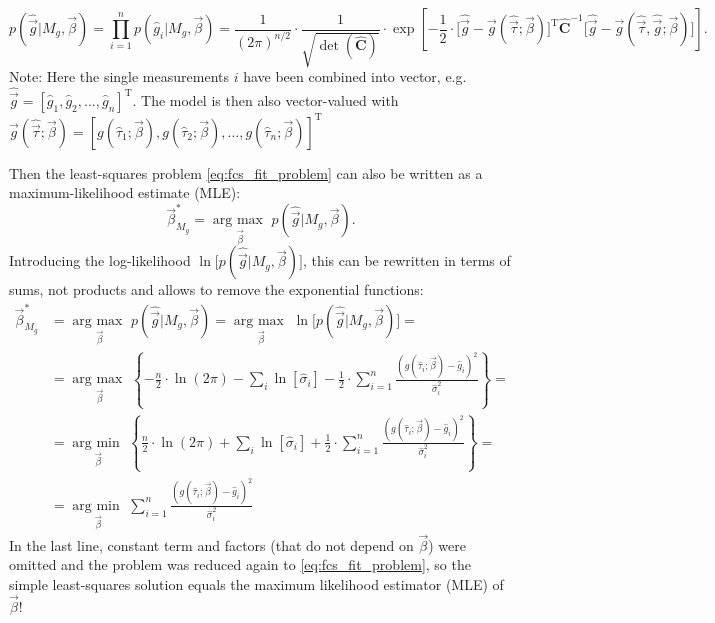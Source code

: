 \documentclass[a4paper,notitlepage]{article}
\DeclareMathOperator*{\argmin}{arg\:min\ }
\DeclareMathOperator*{\argmax}{arg\:max\ }
\newcommand{\mat}[1]{\mathrm{\mathbf{#1}}}
\begin{document}
\begin{equation}\label{eq:fcs_likelihood_covmatrix}
  p(\hat{\vec{g}}|M_g,\vec{\beta})=\prod\limits_{i=1}^np(\hat{g}_i|M_g,\vec{\beta})%
  =\frac{1}{(2\pi)^{n/2}}\cdot\frac{1}{\sqrt{\det(\hat{\mat{C}})}}\cdot\exp\left[-\frac{1}{2}\cdot\bigl[\hat{\vec{g}}-\vec{g}(\hat{\vec{\tau}}; \vec{\beta})\bigr]^\mathrm{T}\hat{\mat{C}}^{-1} \bigl[\hat{\vec{g}}-\vec{g}(\hat{\vec{\tau}}, \hat{\vec{g}}; \vec{\beta})\bigr]\right].
\end{equation}
Note: Here the single measurements $i$ have been combined into vector, e.g. $\hat{\vec{g}}=\left[\hat{g}_1, \hat{g}_2, ..., \hat{g}_n\right]^\mathrm{T}$. The model is then also vector-valued with $\vec{g}(\hat{\vec{\tau}}; \vec{\beta})=\left[g(\hat{\tau}_1;\vec{\beta}), g(\hat{\tau}_2;\vec{\beta}), ..., g(\hat{\tau}_n;\vec{\beta})\right]^\mathrm{T}$

Then the least-squares problem \eqref{eq:fcs_fit_problem} can also be written as a maximum-likelihood estimate (MLE):
\begin{equation}\label{eq:fcs_fit_problem_maxlikelihood}
  \vec{\beta}_{M_g}^\ast=\argmax\limits_{\vec{\beta}}p(\hat{\vec{g}}|M_g,\vec{\beta}).
\end{equation}
Introducing the log-likelihood $\ln \bigl[p(\hat{\vec{g}}|M_g,\vec{\beta})\bigr]$, this can be rewritten in terms of sums, not products and allows to remove the exponential functions:
\begin{align*}
  \vec{\beta}_{M_g}^\ast&=\argmax\limits_{\vec{\beta}}p(\hat{\vec{g}}|M_g,\vec{\beta})=\argmax\limits_{\vec{\beta}}\ln\bigl[p(\hat{\vec{g}}|M_g,\vec{\beta})\bigr]=\\
    &=\argmax\limits_{\vec{\beta}}\left\{-\frac{n}{2}\cdot\ln(2\pi)-\sum\limits_i\ln\left[\hat{\sigma}_i\right]-\frac{1}{2}\cdot\sum\limits_{i=1}^n\frac{\left(g(\hat{\tau}_i;\vec{\beta})-\hat{g}_i\right)^2}{\hat{\sigma}_i^2}\right\}=\\
    &=\argmin\limits_{\vec{\beta}}\left\{\frac{n}{2}\cdot\ln(2\pi)+\sum\limits_i\ln\left[\hat{\sigma}_i\right]+\frac{1}{2}\cdot\sum\limits_{i=1}^n\frac{\left(g(\hat{\tau}_i;\vec{\beta})-\hat{g}_i\right)^2}{\hat{\sigma}_i^2}\right\}=\\
    &=\argmin\limits_{\vec{\beta}} \sum\limits_{i=1}^n\frac{\left(g(\hat{\tau}_i;\vec{\beta})-\hat{g}_i\right)^2}{\hat{\sigma}_i^2}
\end{align*}
In the last line, constant term and factors (that do not depend on $\vec{\beta}$) were omitted and the problem was reduced again to \eqref{eq:fcs_fit_problem}, so the simple least-squares solution equals the maximum likelihood estimator (MLE) of $\vec{\beta}$!
\end{document}
